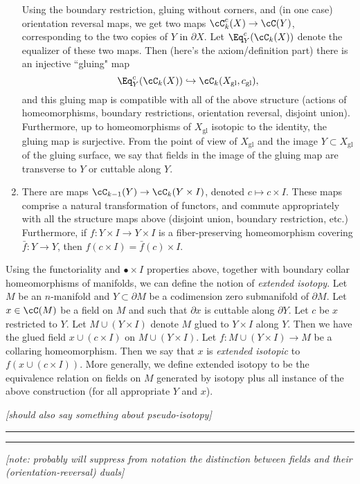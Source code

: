\documentclass[11pt,leqno]{amsart}
\def\bd{\partial}
\def\sgl{_\mathrm{gl}}
\def\nn#1{{{\it \small [#1]}}}
\begin{document}
\begin{enumerate}
Using the boundary restriction, gluing without corners, and (in one case) orientation reversal
maps, we get two maps $\cC^c_k(X) \to \cC(Y)$, corresponding to the two
copies of $Y$ in $\bd X$.
Let $\Eq^c_Y(\cC_k(X))$ denote the equalizer of these two maps.
Then (here's the axiom/definition part) there is an injective ``gluing" map
\[
	\Eq^c_Y(\cC_k(X)) \hookrightarrow \cC_k(X\sgl, c\sgl) ,
\]
and this gluing map is compatible with all of the above structure (actions
of homeomorphisms, boundary restrictions, orientation reversal, disjoint union).
Furthermore, up to homeomorphisms of $X\sgl$ isotopic to the identity,
the gluing map is surjective.
From the point of view of $X\sgl$ and the image $Y \subset X\sgl$ of the 
gluing surface, we say that fields in the image of the gluing map
are transverse to $Y$ or cuttable along $Y$.
\item There are maps $\cC_{k-1}(Y) \to \cC_k(Y \times I)$, denoted
$c \mapsto c\times I$.
These maps comprise a natural transformation of functors, and commute appropriately
with all the structure maps above (disjoint union, boundary restriction, etc.)
Furthermore, if $f: Y\times I \to Y\times I$ is a fiber-preserving homeomorphism
covering $\bar{f}:Y\to Y$, then $f(c\times I) = \bar{f}(c)\times I$.
\end{enumerate}

\bigskip
Using the functoriality and $\bullet\times I$ properties above, together
with boundary collar homeomorphisms of manifolds, we can define the notion of 
{\it extended isotopy}.
Let $M$ be an $n$-manifold and $Y \subset \bd M$ be a codimension zero submanifold
of $\bd M$.
Let $x \in \cC(M)$ be a field on $M$ and such that $\bd x$ is cuttable along $\bd Y$.
Let $c$ be $x$ restricted to $Y$.
Let $M \cup (Y\times I)$ denote $M$ glued to $Y\times I$ along $Y$.
Then we have the glued field $x \cup (c\times I)$ on $M \cup (Y\times I)$.
Let $f: M \cup (Y\times I) \to M$ be a collaring homeomorphism.
Then we say that $x$ is {\it extended isotopic} to $f(x \cup (c\times I))$.
More generally, we define extended isotopy to be the equivalence relation on fields
on $M$ generated by isotopy plus all instance of the above construction
(for all appropriate $Y$ and $x$).

\nn{should also say something about pseudo-isotopy}

\bigskip
\hrule
\bigskip




\bigskip
\hrule
\bigskip

\nn{note: probably will suppress from notation the distinction
between fields and their (orientation-reversal) duals}
\end{document}
